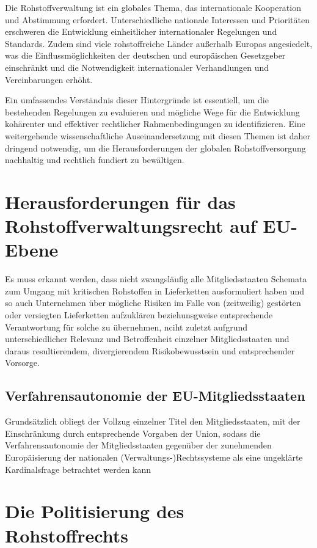 \documentclass[12pt,a4paper,oneside]{book} %
\begin{document}
	Die Rohstoffverwaltung ist ein globales Thema, das internationale Kooperation und Abstimmung erfordert. Unterschiedliche nationale Interessen und Prioritäten erschweren die Entwicklung einheitlicher internationaler Regelungen und Standards. Zudem sind viele rohstoffreiche Länder außerhalb Europas angesiedelt, was die Einflussmöglichkeiten der deutschen und europäischen Gesetzgeber einschränkt und die Notwendigkeit internationaler Verhandlungen und Vereinbarungen erhöht.
	
	Ein umfassendes Verständnis dieser Hintergründe ist essentiell, um die bestehenden Regelungen zu evaluieren und mögliche Wege für die Entwicklung kohärenter und effektiver rechtlicher Rahmenbedingungen zu identifizieren. Eine weitergehende wissenschaftliche Auseinandersetzung mit diesen Themen ist daher dringend notwendig, um die Herausforderungen der globalen Rohstoffversorgung nachhaltig und rechtlich fundiert zu bewältigen.
	
	
	
	\section{Herausforderungen für das Rohstoffverwaltungsrecht auf EU-Ebene}
	Es muss erkannt werden, dass nicht zwangsläufig alle Mitgliedsstaaten Schemata zum Umgang mit kritischen Rohstoffen in Lieferketten ausformuliert haben und so auch Unternehmen über mögliche Risiken im Falle von (zeitweilig) gestörten oder versiegten Lieferketten aufzuklären beziehunsgweise entsprechende Verantwortung für solche zu übernehmen, nciht zuletzt aufgrund unterschiedlicher Relevanz und Betroffenheit einzelner Mitgliedsstaaten und daraus resultierendem, divergierendem Risikobewusstsein und entsprechender Vorsorge.
	
	\subsection{Verfahrensautonomie der EU-Mitgliedsstaaten}
	Grundsätzlich obliegt der Vollzug einzelner Titel den Mitgliedsstaaten, mit der Einschränkung durch entsprechende Vorgaben der Union, sodass die Verfahrensautonomie der Mitgliedsstaaten gegenüber der zunehmenden Europäisierung der nationalen (Verwaltungs-)Rechtssysteme als eine \glqq ungeklärte Kardinalsfrage\grqq \autocite{Ludiwgs, NVwZ 2018, 1417} betrachtet werden kann
	
	
	\section{Die Politisierung des Rohstoffrechts}
	
\end{document}
